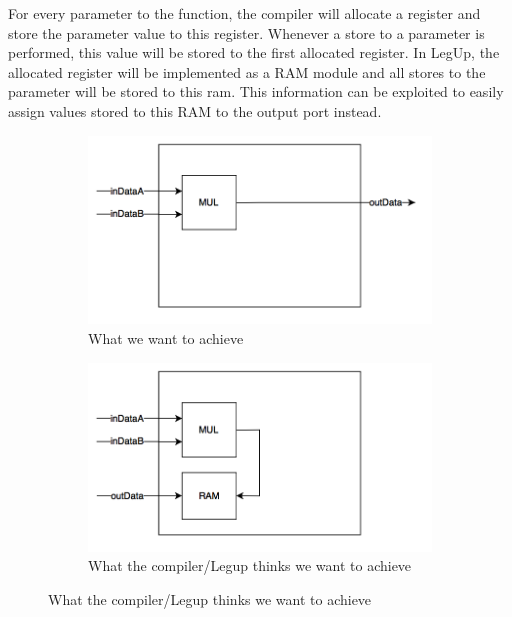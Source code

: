 For every parameter to the function, the compiler will allocate a register and store the parameter value to this register. Whenever a store to a parameter is performed, this value will be stored to the first allocated register. In LegUp, the allocated register will be implemented as a RAM module and all stores to the parameter will be stored to this ram. This information can be exploited to easily assign values stored to this RAM to the output port instead.

\begin{figure}
        \centering
        \begin{subfigure}{0.49\textwidth}\centering%
                    \includegraphics[width=\linewidth]{figs/OutputAssignment1.png}
                \caption{What we want to achieve}
  \label{fig:assignoutputs1}
       \end{subfigure}%
    \hfill
        \begin{subfigure}{0.49\textwidth}\centering
                    \includegraphics[width=\linewidth]{figs/OutputAssignment2.png}
                \caption{What the compiler/Legup thinks we want to achieve}
  \label{fig:assignoutputs2}

\end{subfigure}
\end{figure}
